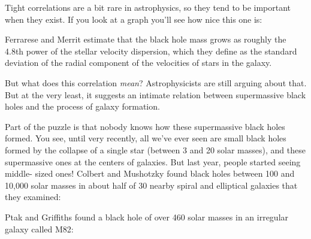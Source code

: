 \documentclass{article}
\def\tightlist{}
\renewcommand{\texttt}[1]{%
  \begingroup
  \ttfamily
  \begingroup\lccode`~=`/\lowercase{\endgroup\def~}{/\discretionary{}{}{}}%
  \begingroup\lccode`~=`[\lowercase{\endgroup\def~}{[\discretionary{}{}{}}%
  \begingroup\lccode`~=`.\lowercase{\endgroup\def~}{.\discretionary{}{}{}}%
  \catcode`/=\active\catcode`[=\active\catcode`.=\active
  \scantokens{#1\noexpand}%
  \endgroup
}
\begin{document}
Tight correlations are a bit rare in astrophysics, so they tend to be
important when they exist. If you look at a graph you'll see how nice
this one is:


Ferrarese and Merrit estimate that the black hole mass grows as roughly
the 4.8th power of the stellar velocity dispersion, which they define as
the standard deviation of the radial component of the velocities of
stars in the galaxy.

But what does this correlation \emph{mean}? Astrophysicists are still
arguing about that. But at the very least, it suggests an intimate
relation between supermassive black holes and the process of galaxy
formation.

Part of the puzzle is that nobody knows how these supermassive black
holes formed. You see, until very recently, all we've ever seen are
small black holes formed by the collapse of a single star (between 3 and
20 solar masses), and these supermassive ones at the centers of
galaxies. But last year, people started seeing middle- sized ones!
Colbert and Mushotzky found black holes between 100 and 10,000 solar
masses in about half of 30 nearby spiral and elliptical galaxies that
they examined:


Ptak and Griffiths found a black hole of over 460 solar masses in an
irregular galaxy called M82:

\end{document}

